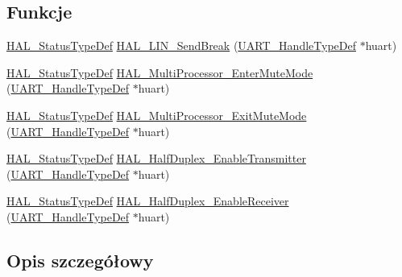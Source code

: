 \subsection*{Funkcje}
\begin{DoxyCompactItemize}
\item 
\hyperlink{stm32f4xx__hal__def_8h_a63c0679d1cb8b8c684fbb0632743478f}{H\+A\+L\+\_\+\+Status\+Type\+Def} \hyperlink{group___u_a_r_t___exported___functions___group3_gaffbf11fb4929f709004a11675cd25fcf}{H\+A\+L\+\_\+\+L\+I\+N\+\_\+\+Send\+Break} (\hyperlink{group___u_a_r_t___exported___types_ga7adf4f3e4c3ecde572be5925c915a967}{U\+A\+R\+T\+\_\+\+Handle\+Type\+Def} $\ast$huart)
\item 
\hyperlink{stm32f4xx__hal__def_8h_a63c0679d1cb8b8c684fbb0632743478f}{H\+A\+L\+\_\+\+Status\+Type\+Def} \hyperlink{group___u_a_r_t___exported___functions___group3_ga659637545299b91d2a77dadaf7266bf2}{H\+A\+L\+\_\+\+Multi\+Processor\+\_\+\+Enter\+Mute\+Mode} (\hyperlink{group___u_a_r_t___exported___types_ga7adf4f3e4c3ecde572be5925c915a967}{U\+A\+R\+T\+\_\+\+Handle\+Type\+Def} $\ast$huart)
\item 
\hyperlink{stm32f4xx__hal__def_8h_a63c0679d1cb8b8c684fbb0632743478f}{H\+A\+L\+\_\+\+Status\+Type\+Def} \hyperlink{group___u_a_r_t___exported___functions___group3_ga81b90fb3a4d7a8601a92260edbd3422f}{H\+A\+L\+\_\+\+Multi\+Processor\+\_\+\+Exit\+Mute\+Mode} (\hyperlink{group___u_a_r_t___exported___types_ga7adf4f3e4c3ecde572be5925c915a967}{U\+A\+R\+T\+\_\+\+Handle\+Type\+Def} $\ast$huart)
\item 
\hyperlink{stm32f4xx__hal__def_8h_a63c0679d1cb8b8c684fbb0632743478f}{H\+A\+L\+\_\+\+Status\+Type\+Def} \hyperlink{group___u_a_r_t___exported___functions___group3_ga58d73e260a5536fb9cb40d7d2fe2b4bb}{H\+A\+L\+\_\+\+Half\+Duplex\+\_\+\+Enable\+Transmitter} (\hyperlink{group___u_a_r_t___exported___types_ga7adf4f3e4c3ecde572be5925c915a967}{U\+A\+R\+T\+\_\+\+Handle\+Type\+Def} $\ast$huart)
\item 
\hyperlink{stm32f4xx__hal__def_8h_a63c0679d1cb8b8c684fbb0632743478f}{H\+A\+L\+\_\+\+Status\+Type\+Def} \hyperlink{group___u_a_r_t___exported___functions___group3_ga396ebbcdbe352c3393ad3007614383ac}{H\+A\+L\+\_\+\+Half\+Duplex\+\_\+\+Enable\+Receiver} (\hyperlink{group___u_a_r_t___exported___types_ga7adf4f3e4c3ecde572be5925c915a967}{U\+A\+R\+T\+\_\+\+Handle\+Type\+Def} $\ast$huart)
\end{DoxyCompactItemize}


\subsection{Opis szczegółowy}


